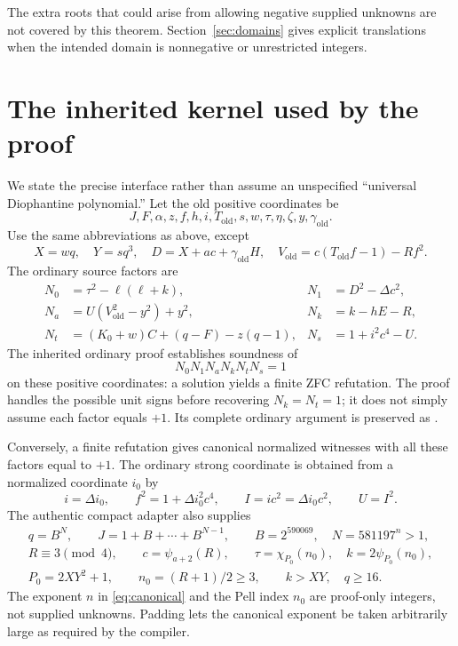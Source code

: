 \documentclass[11pt,a4paper]{article}
\theoremstyle{remark}
\newcommand{\ord}{\mathrm{old}}
\begin{document}
The extra roots that could arise from allowing negative supplied unknowns
are not covered by this theorem. Section~\ref{sec:domains} gives explicit
translations when the intended domain is nonnegative or unrestricted
integers.

\clearpage
\section{The inherited kernel used by the proof}
\label{sec:interface}

We state the precise interface rather than assume an unspecified
``universal Diophantine polynomial.'' Let the old positive coordinates be
\[
 J,F,\alpha,z,f,h,i,T_{\ord},s,w,\tau,\eta,\zeta,y,\gamma_{\ord}.
\]
Use the same abbreviations as above, except
\[
 X=wq,\quad Y=sq^3,\quad
 D=X+ac+\gamma_{\ord}H,\quad
 V_{\ord}=c(T_{\ord}f-1)-Rf^2.
\]
The ordinary source factors are
\begin{align*}
 N_0&=\tau^2-\ell(\ell+k),&
 N_1&=D^2-\Delta c^2,\\
 N_a&=U(V_{\ord}^2-y^2)+y^2,&
 N_k&=k-hE-R,\\
 N_t&=(K_0+w)C+(q-F)-z(q-1),&
 N_s&=1+i^2c^4-U.
\end{align*}
The inherited ordinary proof establishes soundness of
\begin{equation}
 N_0N_1N_aN_kN_tN_s=1
 \label{eq:oldproduct}
\end{equation}
on these positive coordinates: a solution yields a finite ZFC refutation.
The proof handles the possible unit signs before recovering $N_k=N_t=1$;
it does not simply assume each factor equals $+1$. Its complete ordinary
argument is preserved as .

Conversely, a finite refutation gives canonical normalized witnesses with
all these factors equal to $+1$. The ordinary strong coordinate is obtained
from a normalized coordinate $i_0$ by
\begin{equation}
 i=\Delta i_0,\qquad
 f^2=1+\Delta i_0^2c^4,\qquad
 I=ic^2=\Delta i_0c^2,\qquad U=I^2.
 \label{eq:normalized}
\end{equation}
The authentic compact adapter also supplies
\begin{gather}
 q=B^N,\qquad J=1+B+\cdots+B^{N-1},\qquad
 B=2^{590069},\quad N=581197^n>1,\label{eq:canonical}\\
 R\equiv3\pmod4,\qquad
 c=\psi_{a+2}(R),\qquad
 \tau=\chi_{P_0}(n_0),\quad k=2\psi_{P_0}(n_0),\label{eq:canonicalpell}\\
 P_0=2XY^2+1,\qquad n_0=(R+1)/2\ge3,\qquad k>XY,\quad q\ge16.
 \nonumber
\end{gather}
The exponent $n$ in \eqref{eq:canonical} and the Pell index $n_0$ are
proof-only integers, not supplied unknowns. Padding lets the canonical
exponent be taken arbitrarily large as required by the compiler.
\end{document}
